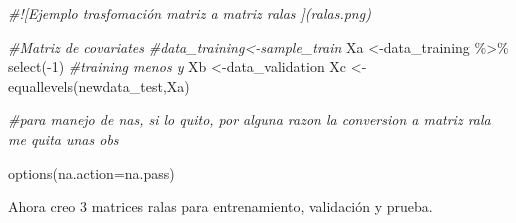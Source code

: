 \documentclass[
]{book}
\newenvironment{Shaded}{\begin{snugshade}}{\end{snugshade}}
\newcommand{\AttributeTok}[1]{\textcolor[rgb]{0.77,0.63,0.00}{#1}}
\newcommand{\CommentTok}[1]{\textcolor[rgb]{0.56,0.35,0.01}{\textit{#1}}}
\newcommand{\DecValTok}[1]{\textcolor[rgb]{0.00,0.00,0.81}{#1}}
\newcommand{\FunctionTok}[1]{\textcolor[rgb]{0.00,0.00,0.00}{#1}}
\newcommand{\NormalTok}[1]{#1}
\newcommand{\OtherTok}[1]{\textcolor[rgb]{0.56,0.35,0.01}{#1}}
\newcommand{\SpecialCharTok}[1]{\textcolor[rgb]{0.00,0.00,0.00}{#1}}
\newcommand{\StringTok}[1]{\textcolor[rgb]{0.31,0.60,0.02}{#1}}
\begin{document}
\begin{Shaded}
\begin{Highlighting}[]
\CommentTok{\#![Ejemplo trasfomación matriz a matriz ralas ](ralas.png)}
\end{Highlighting}
\end{Shaded}

\begin{Shaded}
\begin{Highlighting}[]
\CommentTok{\#Matriz de covariates}
\CommentTok{\#data\_training\textless{}{-}sample\_train}
\NormalTok{Xa }\OtherTok{\textless{}{-}}\NormalTok{data\_training }\SpecialCharTok{\%\textgreater{}\%} \FunctionTok{select}\NormalTok{(}\SpecialCharTok{{-}}\DecValTok{1}\NormalTok{) }\CommentTok{\#training menos y}
\NormalTok{Xb }\OtherTok{\textless{}{-}}\NormalTok{data\_validation}
\NormalTok{Xc }\OtherTok{\textless{}{-}}\FunctionTok{equallevels}\NormalTok{(newdata\_test,Xa)}

\CommentTok{\#para manejo de nas, si lo quito, por alguna razon la conversion a matriz rala me quita unas obs}

\FunctionTok{options}\NormalTok{(}\AttributeTok{na.action=}\StringTok{\textquotesingle{}na.pass\textquotesingle{}}\NormalTok{)}
\end{Highlighting}
\end{Shaded}

Ahora creo 3 matrices ralas para entrenamiento, validación y prueba.

\begin{Shaded}
\end{Shaded}
\end{document}
